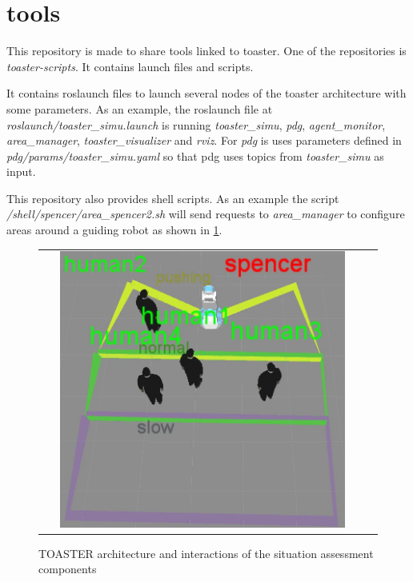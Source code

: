 \documentclass[a4paper]{article}
\begin{document}
\section{tools}
This repository is made to share tools linked to toaster.
One of the repositories is \textit{toaster-scripts}. It contains launch files and scripts.

It contains roslaunch files to launch several nodes of the toaster architecture with some parameters.
As an example, the roslaunch file at  \textit{roslaunch/toaster\_simu.launch} is running \textit{toaster\_simu}, \textit{pdg}, \textit{agent\_monitor}, \textit{area\_manager}, \textit{toaster\_visualizer} and \textit{rviz}. For \textit{pdg} is uses parameters defined in \textit{pdg/params/toaster\_simu.yaml} so that pdg uses topics from \textit{toaster\_simu} as input.

This repository also provides shell scripts. As an example the script \textit{/shell/spencer/area\_spencer2.sh} will send requests to \textit{area\_manager} to configure areas around a guiding robot as shown in \ref{fig:areaspencer}.

 \begin{figure}[ht!]
 \centering
 \begin{tabular}{cc}
  \includegraphics[width=0.9\textwidth]{img/toaster_spencer.jpg}
 \end{tabular}
 \caption{TOASTER architecture and interactions of the situation assessment components}
 \label{fig:areaspencer}
 \end{figure}
\end{document}
